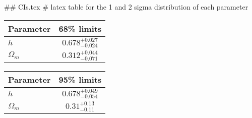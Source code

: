 ## CIs.tex
# latex table for the 1 and 2 sigma distribution of each parameter

\begin{tabular} { l  c}
 Parameter &  68\% limits\\
\hline
{\boldmath$h              $} & $0.678^{+0.027}_{-0.024}   $\\
{\boldmath$\Omega_m       $} & $0.312^{+0.044}_{-0.071}   $\\
\hline
\end{tabular}

\begin{tabular} { l  c}
 Parameter &  95\% limits\\
\hline
{\boldmath$h              $} & $0.678^{+0.049}_{-0.054}   $\\
{\boldmath$\Omega_m       $} & $0.31^{+0.13}_{-0.11}      $\\
\hline
\end{tabular}
